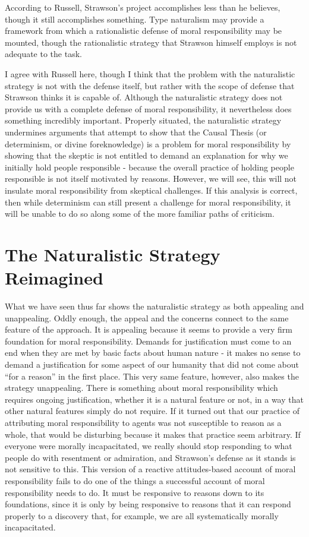 \documentclass[phd,12pt,oneside,paper=letterpaper]{ubcthesis}
\begin{document}
According to Russell, Strawson's project accomplishes less than he believes, though it still accomplishes something. Type naturalism may provide a framework from which a rationalistic defense of moral responsibility may be mounted, though the rationalistic strategy that Strawson himself employs is not adequate to the task. \citep[p.299]{russell1992}

I agree with Russell here, though I think that the problem with the naturalistic strategy is not with the defense itself, but rather with the scope of defense that Strawson thinks it is capable of. Although the naturalistic strategy does not provide us with a complete defense of moral responsibility, it nevertheless does something incredibly important. Properly situated, the naturalistic strategy undermines arguments that attempt to show that the Causal Thesis (or determinism, or divine foreknowledge) is a problem for moral responsibility by showing that the skeptic is not entitled to demand an explanation for why we initially hold people responsible - because the overall practice of holding people responsible is not itself motivated by reasons. However, we will see, this will not insulate moral responsibility from skeptical challenges. If this analysis is correct, then while determinism can still present a challenge for moral responsibility, it will be unable to do so along some of the more familiar paths of criticism. 

\section{The Naturalistic Strategy Reimagined}
What we have seen thus far shows the naturalistic strategy as both appealing and unappealing. Oddly enough, the appeal and the concerns connect to the same feature of the approach. It is appealing because it seems to provide a very firm foundation for moral responsibility. Demands for justification must come to an end when they are met by basic facts about human nature - it makes no sense to demand a justification for some aspect of our humanity that did not come about ``for a reason'' in the first place. This very same feature, however, also makes the strategy unappealing. There is something about moral responsibility which requires ongoing justification, whether it is a natural feature or not, in a way that other natural features simply do not require. If it turned out that our practice of attributing moral responsibility to agents was not susceptible to reason as a whole, that would be disturbing because it makes that practice seem arbitrary. If everyone were morally incapacitated, we really should stop responding to what people do with resentment or admiration, and Strawson's defense as it stands is not sensitive to this. This version of a reactive attitudes-based account of moral responsibility fails to do one of the things a successful account of moral responsibility needs to do. It must be responsive to reasons down to its foundations, since it is only by being responsive to reasons that it can respond properly to a discovery that, for example, we are all systematically morally incapacitated. 
\end{document}
